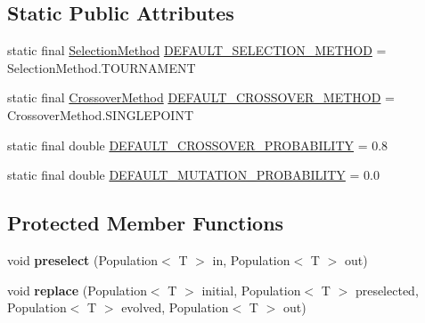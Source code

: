 \subsection*{Static Public Attributes}
\begin{CompactItemize}
\item 
static final \hyperlink{classjenes_1_1stage_1_1operator_1_1common_1_1_deterministic_crowder_3_01_t_01extends_01_chromosome_01_4_f734ac23216aafb25e63014b0b676e67}{SelectionMethod} \hyperlink{classjenes_1_1stage_1_1operator_1_1common_1_1_deterministic_crowder_3_01_t_01extends_01_chromosome_01_4_5ca3f3abce0f3163383ed9158b154289}{DEFAULT\_\-SELECTION\_\-METHOD} = SelectionMethod.TOURNAMENT
\item 
static final \hyperlink{classjenes_1_1stage_1_1operator_1_1common_1_1_deterministic_crowder_3_01_t_01extends_01_chromosome_01_4_e58e16af4a8087c42225aa099718231d}{CrossoverMethod} \hyperlink{classjenes_1_1stage_1_1operator_1_1common_1_1_deterministic_crowder_3_01_t_01extends_01_chromosome_01_4_a09cba6e344d7681789f11213d6cccd0}{DEFAULT\_\-CROSSOVER\_\-METHOD} = CrossoverMethod.SINGLEPOINT
\item 
static final double \hyperlink{classjenes_1_1stage_1_1operator_1_1common_1_1_deterministic_crowder_3_01_t_01extends_01_chromosome_01_4_824ea51baffd4e4b2fb045d38b964321}{DEFAULT\_\-CROSSOVER\_\-PROBABILITY} = 0.8
\item 
static final double \hyperlink{classjenes_1_1stage_1_1operator_1_1common_1_1_deterministic_crowder_3_01_t_01extends_01_chromosome_01_4_5a4e77ddc158a661371ea5934cce2977}{DEFAULT\_\-MUTATION\_\-PROBABILITY} = 0.0
\end{CompactItemize}
\subsection*{Protected Member Functions}
\begin{CompactItemize}
\item 
\hypertarget{classjenes_1_1stage_1_1operator_1_1common_1_1_deterministic_crowder_3_01_t_01extends_01_chromosome_01_4_ee04796d9d0ad969443b30cc88a1b964}{
void \textbf{preselect} (Population$<$ T $>$ in, Population$<$ T $>$ out)}
\label{classjenes_1_1stage_1_1operator_1_1common_1_1_deterministic_crowder_3_01_t_01extends_01_chromosome_01_4_ee04796d9d0ad969443b30cc88a1b964}

\item 
\hypertarget{classjenes_1_1stage_1_1operator_1_1common_1_1_deterministic_crowder_3_01_t_01extends_01_chromosome_01_4_8d9591e3962f36f1f2f59be9395806b4}{
void \textbf{replace} (Population$<$ T $>$ initial, Population$<$ T $>$ preselected, Population$<$ T $>$ evolved, Population$<$ T $>$ out)}
\label{classjenes_1_1stage_1_1operator_1_1common_1_1_deterministic_crowder_3_01_t_01extends_01_chromosome_01_4_8d9591e3962f36f1f2f59be9395806b4}

\end{CompactItemize}


